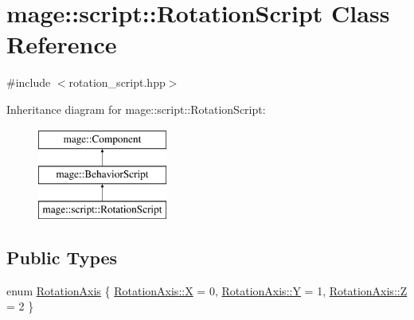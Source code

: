 \hypertarget{classmage_1_1script_1_1_rotation_script}{}\section{mage\+:\+:script\+:\+:Rotation\+Script Class Reference}
\label{classmage_1_1script_1_1_rotation_script}


{\ttfamily \#include $<$rotation\+\_\+script.\+hpp$>$}

Inheritance diagram for mage\+:\+:script\+:\+:Rotation\+Script\+:\begin{figure}[H]
\begin{center}
\leavevmode
\includegraphics[height=3.000000cm]{classmage_1_1script_1_1_rotation_script}
\end{center}
\end{figure}
\subsection*{Public Types}
\begin{DoxyCompactItemize}
\item 
enum \hyperlink{classmage_1_1script_1_1_rotation_script_aa8a91cc8c771fc777ffb5e8a28c43ad2}{Rotation\+Axis} \{ \hyperlink{classmage_1_1script_1_1_rotation_script_aa8a91cc8c771fc777ffb5e8a28c43ad2a02129bb861061d1a052c592e2dc6b383}{Rotation\+Axis\+::X} = 0, 
\hyperlink{classmage_1_1script_1_1_rotation_script_aa8a91cc8c771fc777ffb5e8a28c43ad2a57cec4137b614c87cb4e24a3d003a3e0}{Rotation\+Axis\+::Y} = 1, 
\hyperlink{classmage_1_1script_1_1_rotation_script_aa8a91cc8c771fc777ffb5e8a28c43ad2a21c2e59531c8710156d34a3c30ac81d5}{Rotation\+Axis\+::Z} = 2
 \}
\end{DoxyCompactItemize}
